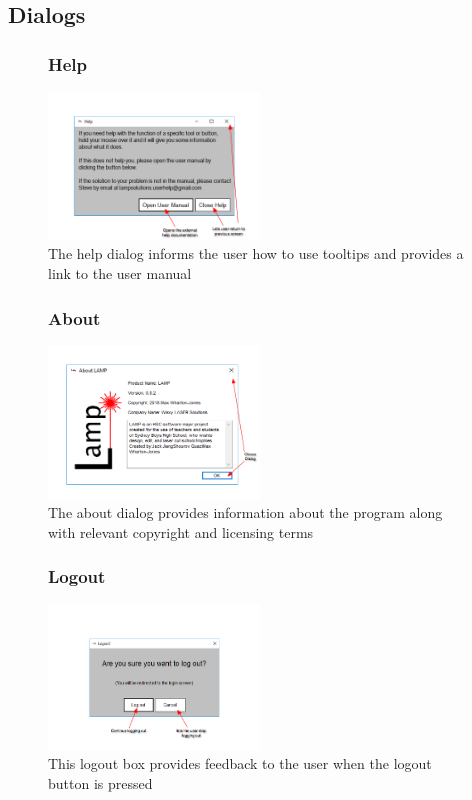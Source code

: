 \documentclass[oneside,openany,11pt,a4paper]{report}
\begin{document}
\subsection{Dialogs}
\begin{figure}[H]
	\centering
	\subsubsection{Help}
	\includegraphics[width=0.5\textwidth]{screen/help.png}
	\caption{The help dialog informs the user how to use tooltips  and provides a link to the user manual}
\end{figure}
\begin{figure}[H]
	\centering
	\subsubsection{About}
	\includegraphics[width=0.5\textwidth]{screen/about.png}
	\caption{The about dialog provides information about the program along with relevant copyright and licensing terms}
\end{figure}

\begin{figure}[H]
	\centering
	\subsubsection{Logout}
	\includegraphics[width=0.5\textwidth]{screen/logout.png}
	\caption{This logout box provides feedback to the user when the logout button is pressed}
\end{figure}
\end{document}
